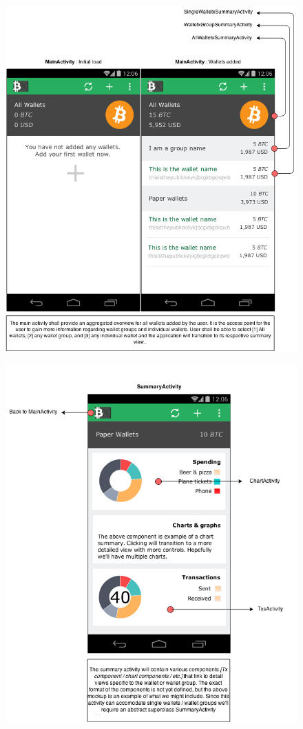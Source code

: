 	\begin{figure}[H]
     \includegraphics[width=1.0\textwidth]{../diagrams/storyboard_main.png}
  \end{figure}
  \begin{figure}[H]
     \includegraphics[width=1.0\textwidth]{../diagrams/storyboard_summary.png}
  \end{figure}
